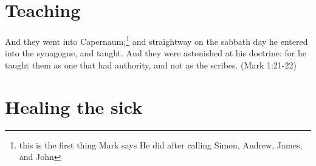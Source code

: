 \section{Teaching}
And they went into Capernaum;\footnote{this is the first thing Mark says He did after calling Simon, Andrew, James, and John} and straightway on the sabbath day he entered into the synagogue, and taught. And they were astonished at his doctrine: for he taught them as one that had authority, and not as the scribes. (Mark 1:21-22)

\section{Healing the sick}

